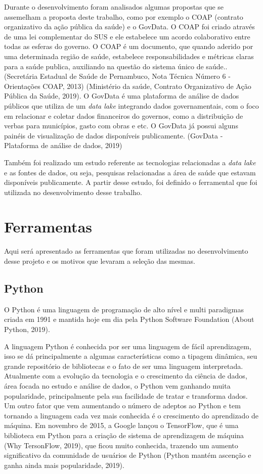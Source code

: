 \documentclass[
	12pt,				%
	openright,			%
	oneside,			%
	a4paper,			%
	chapter=TITLE,		%
	section=TITLE,		%
	subsection=TITLE,	%
	subsubsection=TITLE,%
	english,			%
	brazil				%
	]{abntex2}
\theoremstyle{definition}
\begin{document}
    Durante o desenvolvimento foram analisados algumas propostas que se assemelham a proposta deste trabalho, como por exemplo o COAP (contrato organizativo da ação pública da saúde) e o GovData. O COAP foi criado através de uma lei complementar do SUS e ele estabelece um acordo colaborativo entre todas as esferas do governo. O COAP é um documento, que quando aderido por uma determinada região de saúde, estabelece responsabilidades e métricas claras para a saúde publica, auxiliando na questão do sistema único de saúde.. (Secretária Estadual de Saúde de Pernambuco, Nota Técnica Número 6 - Orientações COAP, 2013) (Ministério da saúde, Contrato Organizativo de Ação Pública da Saúde, 2019). O GovData é uma plataforma de análise de dados públicos que utiliza de um \textit{data lake} integrando dados governamentais, com o foco em relacionar e coletar dados financeiros do governos,  como a distribuição de verbas para municípios, gasto com obras e etc. O GovData já possui alguns painéis de visualização de dados disponíveis publicamente. (GovData - Plataforma de análise de dados, 2019)
    
    Também foi realizado um estudo referente as tecnologias relacionadas a \textit{data lake} e as fontes de dados, ou seja, pesquisas relacionadas a área de saúde que estavam disponíveis publicamente. A partir desse estudo, foi definido o ferramental que foi utilizada no desenvolvimento desse trabalho. 
    
\section{Ferramentas}
    Aqui será apresentado as ferramentas que foram utilizadas no desenvolvimento desse projeto e os motivos que levaram a seleção das mesmas. 
    
\subsection{Python}
    
    O Python é uma linguagem de programação de alto nível e multi paradigmas criada em 1991 e mantida hoje em dia pela Python Software Foundation (About Python, 2019). 
    
    A linguagem Python é conhecida por ser uma linguagem de fácil aprendizagem, isso se dá principalmente a algumas características como a tipagem dinâmica, seu grande repositório de bibliotecas e o fato de ser uma linguagem interpretada. Atualmente com a evolução da tecnologia e o crescimento da ciência de dados, área focada no estudo e análise de dados, o Python vem ganhando muita popularidade, principalmente pela sua facilidade de tratar e transforma dados. Um outro fator que vem aumentando o número de adeptos ao Python e tem tornando a linguagem cada vez mais conhecida é o crescimento do aprendizado de máquina. Em novembro de 2015, a Google lançou o TensorFlow, que é uma biblioteca em Python para a criação de sistema de aprendizagem de máquina (Why TersonFlow, 2019), que ficou muito conhecida, trazendo um aumento significativo da comunidade de usuários de Python (Python mantém ascenção e ganha ainda mais popularidade, 2019). 
    
\end{document}

